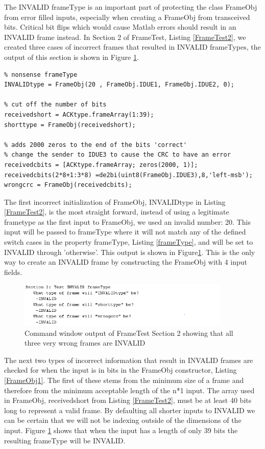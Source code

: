 The INVALID frameType is an important part of protecting the class FrameObj from error filled inputs, especially when creating a FrameObj from transceived bits. Critical bit flips which would cause Matlab errors should result in an INVALID frame instead. In Section 2 of FrameTest, Listing \ref{FrameTest2}, we created three cases of incorrect frames that resulted in INVALID frameTypes, the output of this section is shown in Figure \ref{fig:FrameTest2}.

\begin{lstlisting} 
% nonsense frameType
INVALIDtype = FrameObj(20 , FrameObj.IDUE1, FrameObj.IDUE2, 0);

% cut off the number of bits
receivedshort = ACKtype.frameArray(1:39);
shorttype = FrameObj(receivedshort);

% adds 2000 zeros to the end of the bits 'correct'
% change the sender to IDUE3 to cause the CRC to have an error
receivedcbits = [ACKtype.frameArray; zeros(2000, 1)];
receivedcbits(2*8+1:3*8) =de2bi(uint8(FrameObj.IDUE3),8,'left-msb');
wrongcrc = FrameObj(receivedcbits);
\end{lstlisting} 

The first incorrect initialization of FrameObj, INVALIDtype in Listing \ref{FrameTest2}, is the most straight forward, instead of using a legitimate frametype as the first input to FrameObj, we used an invalid number: 20. This input will be passed to frameType where it will not match any of the defined switch cases in the property frameType, Listing \ref{frameType}, and will be set to INVALID through 'otherwise'. This output is shown in Figure\ref{fig:FrameTest2}.  This is the only way to create an INVALID frame by constructing the FrameObj with 4 input fields. 

\begin{figure}[ht]
    \includegraphics[width=0.9\textwidth]{FrameTest2.PNG}
    \caption{Command window output of FrameTest Section 2 showing that all three very wrong frames are INVALID }
    \label{fig:FrameTest2}
\end{figure}

The next two types of incorrect information that result in INVALID frames are checked for when the input is in bits in the FrameObj constructor, Listing \ref{FrameObj1}. The first of these stems from the minimum size of a frame and therefore from the minimum acceptable length of the n*1 input. The array used in FrameObj, receivedshort from Listing \ref{FrameTest2},  must be at least 40 bits long to represent a valid frame. By defaulting all shorter inputs to INVALID we can be certain that we will not be indexing outside of the dimensions of the input. Figure \ref{fig:FrameTest2} shows that when the input has a length of only 39 bits the resulting frameType will be INVALID. 

